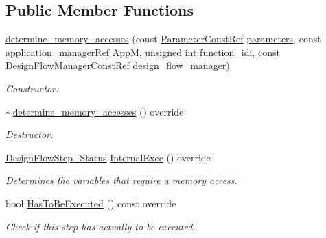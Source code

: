 \subsection*{Public Member Functions}
\begin{DoxyCompactItemize}
\item 
\hyperlink{classdetermine__memory__accesses_a379def7cb52f5a4b51961127aa859410}{determine\+\_\+memory\+\_\+accesses} (const \hyperlink{Parameter_8hpp_a37841774a6fcb479b597fdf8955eb4ea}{Parameter\+Const\+Ref} \hyperlink{classDesignFlowStep_a802eaafe8013df706370679d1a436949}{parameters}, const \hyperlink{application__manager_8hpp_a04ccad4e5ee401e8934306672082c180}{application\+\_\+manager\+Ref} \hyperlink{classFrontendFlowStep_a0ac0d8db2a378416583f51c4faa59d15}{AppM}, unsigned int function\+\_\+idi, const Design\+Flow\+Manager\+Const\+Ref \hyperlink{classDesignFlowStep_ab770677ddf087613add30024e16a5554}{design\+\_\+flow\+\_\+manager})
\begin{DoxyCompactList}\small\item\em Constructor. \end{DoxyCompactList}\item 
\hyperlink{classdetermine__memory__accesses_a9fcc117c8717ee2001a9bda537f7c010}{$\sim$determine\+\_\+memory\+\_\+accesses} () override
\begin{DoxyCompactList}\small\item\em Destructor. \end{DoxyCompactList}\item 
\hyperlink{design__flow__step_8hpp_afb1f0d73069c26076b8d31dbc8ebecdf}{Design\+Flow\+Step\+\_\+\+Status} \hyperlink{classdetermine__memory__accesses_a28439693ec5dde524cb6ae92d6d8ce28}{Internal\+Exec} () override
\begin{DoxyCompactList}\small\item\em Determines the variables that require a memory access. \end{DoxyCompactList}\item 
bool \hyperlink{classdetermine__memory__accesses_a5a273a8e5ec33a4abc8989169231c827}{Has\+To\+Be\+Executed} () const override
\begin{DoxyCompactList}\small\item\em Check if this step has actually to be executed. \end{DoxyCompactList}\end{DoxyCompactItemize}
